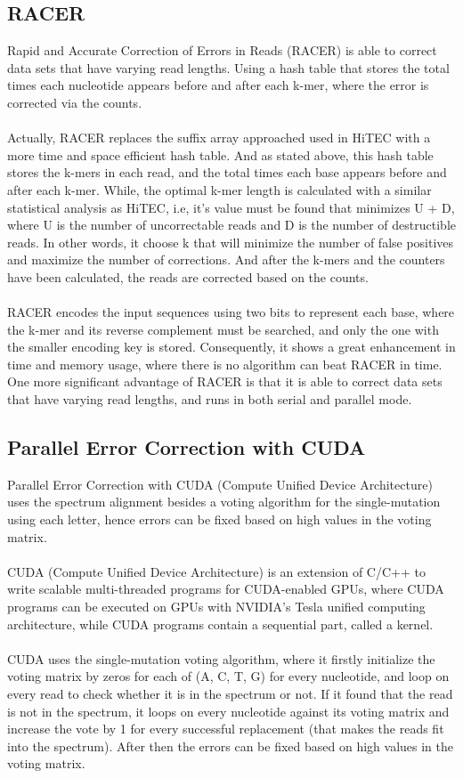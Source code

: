 \documentclass[12pt]{llncs}
\begin{document}
\subsection{RACER}
Rapid and Accurate Correction of Errors in Reads (RACER) \cite{Racer} is able to correct data sets that have varying read lengths. Using a hash table that stores the total times each nucleotide appears before and after each k-mer, where the error is corrected via the counts.
\\
\\
Actually, RACER replaces the suffix array approached used in HiTEC with a more time and space efficient hash table. And as stated above, this hash table stores the k-mers in each read, and the total times each base appears before and after each k-mer. While, the optimal k-mer length is calculated with a similar statistical analysis as HiTEC, i.e, it's value must be found that minimizes U + D, where U is the number of uncorrectable reads and D is the number of destructible reads. In other words, it choose k that will minimize the number of false positives and maximize the number of corrections. And after the k-mers and the counters have been calculated, the reads are corrected based on the counts.
\\
\\
RACER encodes the input sequences using two bits to represent each base, where the k-mer and its reverse complement must be searched, and only the one with the smaller encoding key is stored. Consequently, it shows a great enhancement in time and memory usage, where there is no algorithm can beat RACER in time.
\\
One more significant advantage of RACER is that it is able to correct data sets that have varying read lengths, and runs in both serial and parallel mode.
 

\subsection{Parallel Error Correction with CUDA}
Parallel Error Correction with CUDA (Compute Unified Device Architecture) \cite{Cuda} uses the spectrum alignment besides a voting algorithm for the single-mutation using each letter, hence errors can be fixed based on high values in the voting matrix.
\\
\\
CUDA (Compute Unified Device Architecture) is an extension of C/C++ to write scalable multi-threaded programs for CUDA-enabled GPUs, where CUDA programs can be executed on GPUs with NVIDIA’s Tesla unified computing architecture, while CUDA programs contain a sequential part, called a kernel.
\\
\\
CUDA uses the single-mutation voting algorithm, where it firstly initialize the voting matrix by zeros for each of (A, C, T, G) for every nucleotide, and loop on every read to check whether it is in the spectrum or not. If it found that the read is not in the spectrum, it loops on every nucleotide against its voting matrix and increase the vote by 1 for every successful replacement (that makes the reads fit into the spectrum). After then the errors can be fixed based on high values in the voting matrix.
\end{document}
